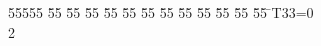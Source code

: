 %
%
\begin{tabbing}
55555 \= 55 \= 55 \= 55 \= 55 \= 55 \= 55 \= 55 \= 55 \= 55 \= 55 \= 55 \= 55 \= \>T33=0\\[0pt]
2\>\end{tabbing}
